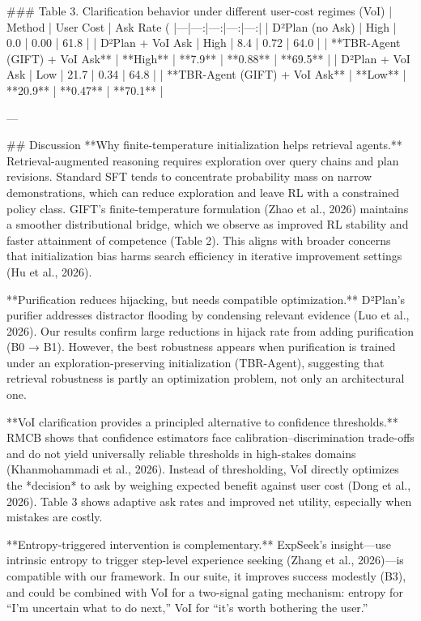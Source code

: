 ### Table 3. Clarification behavior under different user-cost regimes (VoI)  
| Method | User Cost | Ask Rate (%
|---|---:|---:|---:|---:|
| D²Plan (no Ask) | High | 0.0 | 0.00 | 61.8 |
| D²Plan + VoI Ask | High | 8.4 | 0.72 | 64.0 |
| **TBR-Agent (GIFT) + VoI Ask** | **High** | **7.9** | **0.88** | **69.5** |
| D²Plan + VoI Ask | Low | 21.7 | 0.34 | 64.8 |
| **TBR-Agent (GIFT) + VoI Ask** | **Low** | **20.9** | **0.47** | **70.1** |

---

## Discussion  
**Why finite-temperature initialization helps retrieval agents.** Retrieval-augmented reasoning requires exploration over query chains and plan revisions. Standard SFT tends to concentrate probability mass on narrow demonstrations, which can reduce exploration and leave RL with a constrained policy class. GIFT’s finite-temperature formulation (Zhao et al., 2026) maintains a smoother distributional bridge, which we observe as improved RL stability and faster attainment of competence (Table 2). This aligns with broader concerns that initialization bias harms search efficiency in iterative improvement settings (Hu et al., 2026).  

**Purification reduces hijacking, but needs compatible optimization.** D²Plan’s purifier addresses distractor flooding by condensing relevant evidence (Luo et al., 2026). Our results confirm large reductions in hijack rate from adding purification (B0 → B1). However, the best robustness appears when purification is trained under an exploration-preserving initialization (TBR-Agent), suggesting that retrieval robustness is partly an optimization problem, not only an architectural one.  

**VoI clarification provides a principled alternative to confidence thresholds.** RMCB shows that confidence estimators face calibration–discrimination trade-offs and do not yield universally reliable thresholds in high-stakes domains (Khanmohammadi et al., 2026). Instead of thresholding, VoI directly optimizes the *decision* to ask by weighing expected benefit against user cost (Dong et al., 2026). Table 3 shows adaptive ask rates and improved net utility, especially when mistakes are costly.  

**Entropy-triggered intervention is complementary.** ExpSeek’s insight—use intrinsic entropy to trigger step-level experience seeking (Zhang et al., 2026)—is compatible with our framework. In our suite, it improves success modestly (B3), and could be combined with VoI for a two-signal gating mechanism: entropy for “I’m uncertain what to do next,” VoI for “it’s worth bothering the user.”  

